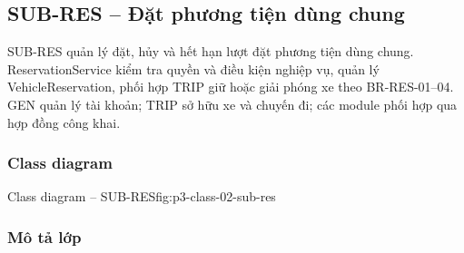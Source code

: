 \par\medskip
\noindent\begin{minipage}{\linewidth}
\subsection{SUB-RES -- Đặt phương tiện dùng chung}
SUB-RES quản lý đặt, hủy và hết hạn lượt đặt phương tiện dùng chung. ReservationService kiểm tra quyền và điều kiện nghiệp vụ, quản lý VehicleReservation, phối hợp TRIP giữ hoặc giải phóng xe theo BR-RES-01--04. GEN quản lý tài khoản; TRIP sở hữu xe và chuyến đi; các module phối hợp qua hợp đồng công khai.

\subsubsection{Class diagram}
{Class diagram -- SUB-RES}{fig:p3-class-02-sub-res}
\end{minipage}\par


\subsubsection{Mô tả lớp}

